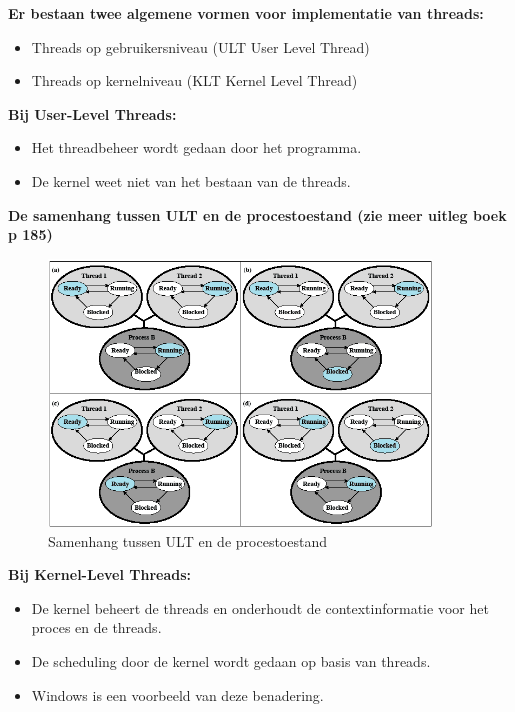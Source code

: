 \textbf{Er bestaan twee algemene vormen voor implementatie van threads:}

\begin{itemize}
\item Threads op gebruikersniveau (ULT User Level Thread)
\item Threads op kernelniveau (KLT Kernel Level Thread)
\end{itemize}

\textbf{Bij User-Level Threads:}

\begin{itemize}
        \item Het threadbeheer wordt gedaan door het programma.
        \item De kernel weet niet van het bestaan van de threads.
\end{itemize}

\newpage

\textbf{De samenhang tussen ULT en de procestoestand (zie meer uitleg boek p 185)}

\begin{figure}[htp]
    \centering
            \includegraphics[width=4in]{img/samenhangultprocestoestand.png}
        \caption{Samenhang tussen ULT en de procestoestand}
    \label{fig:Samenhang tussen ULT en de procestoestand}
\end{figure}

\textbf{Bij Kernel-Level Threads:}

\begin{itemize}
    \item De kernel beheert de threads en onderhoudt de contextinformatie voor het proces en de threads.
    \item De scheduling door de kernel wordt gedaan op basis van threads.
        
    \item Windows is een voorbeeld van deze benadering.
\end{itemize}
	
